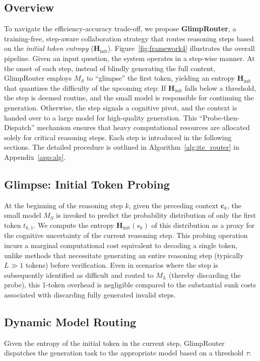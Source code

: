 \documentclass[11pt]{article}
\newcommand{\approach}{{GlimpRouter}\xspace}
\begin{document}
\subsection{Overview}
To navigate the efficiency-accuracy trade-off, we propose \textbf{\approach}, a training-free, step-aware collaboration strategy that routes reasoning steps based on the \textit{initial token entropy} ($\mathbf{H}_\text{init}$).
Figure~\ref{fig:framework4} illustrates the overall pipeline.
Given an input question, the system operates in a step-wise manner. At the onset of each step, instead of blindly generating the full content, \approach employs $M_S$ to ``glimpse'' the first token, yielding an entropy $\mathbf{H}_\text{init}$ that quantizes the difficulty of the upcoming step: 
If $\mathbf{H}_\text{init}$ falls below a threshold, the step is deemed routine, and the small model is responsible for continuing the generation.
Otherwise, the step signals a cognitive pivot, and the context is handed over to a large model for high-quality generation.
This ``Probe-then-Dispatch'' mechanism ensures that heavy computational resources are allocated solely for critical reasoning steps. Each step is introduced in the following sections.
The detailed procedure is outlined in Algorithm~\ref{alg:ite_router} in Appendix~\ref{app:alg}.

\subsection{Glimpse: Initial Token Probing} 
At the beginning of the reasoning step $k$, given the preceding context $\mathbf{c}_k$, the small model $M_S$ is invoked to predict the probability distribution of only the first token $t_{k,1}$. We compute the entropy $\mathbf{H}_\text{init}(s_k)$ of this distribution as a proxy for the cognitive uncertainty of the current reasoning step.
This probing operation incurs a marginal computational cost equivalent to decoding a single token, unlike methods that necessitate generating an entire reasoning step (typically $L \gg 1$ tokens) before verification. Even in scenarios where the step is subsequently identified as difficult and routed to $M_L$ (thereby discarding the probe), this 1-token overhead is negligible compared to the substantial sunk costs associated with discarding fully generated invalid steps. 

\subsection{Dynamic Model Routing} 
Given the entropy of the initial token in the current step, \approach dispatches the generation task to the appropriate model based on a threshold $\tau$:
\end{document}
